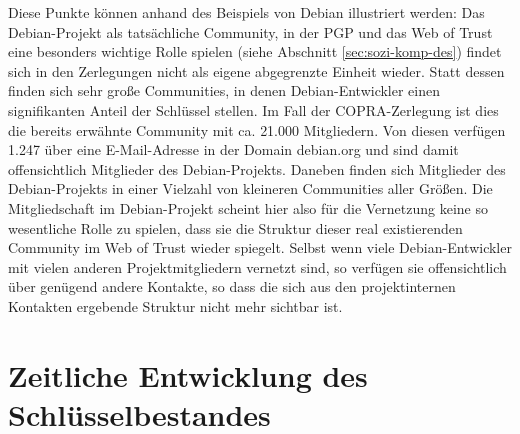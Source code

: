 Diese Punkte können anhand des Beispiels von Debian illustriert
werden: Das Debian-Projekt als tatsächliche Community, in der PGP
und das Web of Trust eine besonders wichtige Rolle spielen (siehe
Abschnitt \ref{sec:sozi-komp-des}) findet sich in den Zerlegungen
nicht als eigene abgegrenzte Einheit wieder. Statt dessen finden sich
sehr große Communities, in denen Debian-Entwickler einen signifikanten
Anteil der Schlüssel stellen. Im Fall der COPRA-Zerlegung ist dies
die bereits erwähnte Community mit ca. 21.000 Mitgliedern. Von
diesen verfügen 1.247 über eine E-Mail-Adresse in der Domain
debian.org und sind damit offensichtlich Mitglieder des
Debian-Projekts. Daneben finden sich Mitglieder des Debian-Projekts in
einer Vielzahl von kleineren Communities aller Größen. Die
Mitgliedschaft im Debian-Projekt scheint hier also für die
Vernetzung keine so wesentliche Rolle zu spielen, dass sie die
Struktur dieser real existierenden Community im Web of Trust
wieder spiegelt. Selbst wenn viele Debian-Entwickler mit vielen anderen
Projektmitgliedern vernetzt sind, so verfügen sie offensichtlich
über genügend andere Kontakte, so dass die sich aus den
projektinternen Kontakten ergebende Struktur nicht mehr
sichtbar ist.

\section{Zeitliche Entwicklung des Schlüsselbestandes}
\label{sec:result-key-properties}

